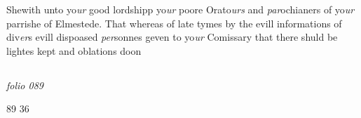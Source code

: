 \documentclass[12pt, a4paper]{book}
\begin{document}
 
 	
				\marginpar[\vspace{0.5cm}{\textcolor{Gray}{Elmested}}]{}
			
 	
		\ifthenelse{\isodd{\thepage}}
		{\reversemarginpar}
		{\normalmarginpar}
		Shewith unto yo\textit{ur} good lordshipp yo\textit{ur} poore Orato\textit{urs}
 and \textit{par}ochianers of yo\textit{ur} parrishe of Elmestede. That
 whereas of late tymes by the evill informations of
 div\textit{er}s evill dispoased \textit{per}sonnes geven to yo\textit{ur} Comissary
 that there shuld be lightes kept and oblations doon


\dotfill
						\newpage {} \subsection*{}  \subsection*{}

\textit{folio 089}


\begin{flushright}{\color{Mahogany}89} 36\end{flushright}
	
		
			
		
				\marginpar[\vspace{0.5cm}{\textcolor{Gray}{n}}]{}
			
\end{document}
